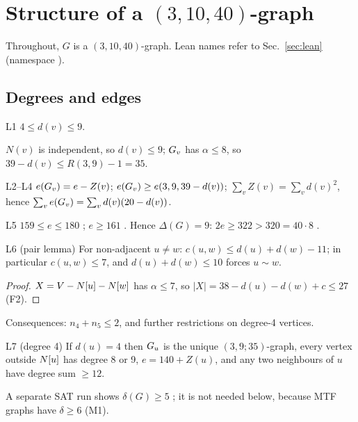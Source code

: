 \section{Structure of a \texorpdfstring{$(3,10,40)$}{(3,10,40)}-graph}\label{sec:structure}

Throughout, $G$ is a $(3,10,40)$-graph. Lean names refer to Sec.~\ref{sec:lean} (namespace ).

\subsection{Degrees and edges}\label{sec:degrees}
\begin{namedthm}{L1}
$4 \le d(v) \le 9$.
\end{namedthm}
$N(v)$ is independent, so $d(v) \le 9$; $G_{v}$ has $\alpha \le 8$, so $39 - d(v) \le R(3,9) - 1 = 35$.

\begin{namedthm}{L2--L4}
$e(G_{v}) = e - Z(v)$; $e(G_{v}) \ge e(3,9,39-d(v))$; $\sum_v Z(v) = \sum_v d(v)^2$, hence
$\sum_v e(G_{v}) = \sum_v d(v)(20 - d(v))$.
\end{namedthm}

\begin{namedthm}{L5}
$159 \le e \le 180$ ;
$e \ge 161$ . Hence $\Delta(G) = 9$: $2e \ge 322 > 320 = 40 \cdot 8$ .
\end{namedthm}

\begin{namedthm}{L6 (pair lemma)}
For non-adjacent $u \ne w$: $c(u,w) \le d(u) + d(w) - 11$; in particular $c(u,w) \le 7$, and
$d(u) + d(w) \le 10$ forces $u \sim w$.
\end{namedthm}
\begin{proof}
$X = V - N[u] - N[w]$ has $\alpha \le 7$, so $|X| = 38 - d(u) - d(w) + c \le 27$ (F2).
\end{proof}
Consequences: $n_4 + n_5 \le 2$, and further restrictions on degree-4 vertices. 

\begin{namedthm}{L7 (degree 4)}
If $d(u) = 4$ then $G_{u}$ is the unique $(3,9;35)$-graph, every vertex outside $N[u]$ has degree 8 or 9,
$e = 140 + Z(u)$, and any two neighbours of $u$ have degree sum $\ge 12$.
\end{namedthm}
A separate SAT run shows $\delta(G) \ge 5$ ; it is not
needed below, because MTF graphs have $\delta \ge 6$ (M1).


